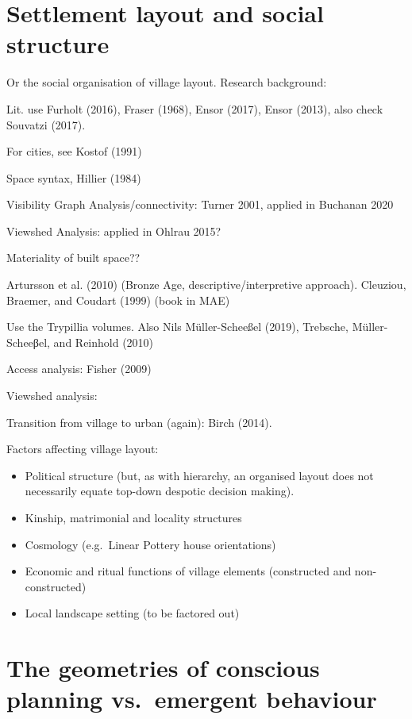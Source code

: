 \documentclass[
  12pt,
  a4paper, twoside]{book}
\begin{document}
\hypertarget{settlement-layout-and-social-structure}{%
\section{Settlement layout and social structure}\label{settlement-layout-and-social-structure}}

Or the social organisation of village layout. Research background:

Lit. use Furholt (2016), Fraser (1968), Ensor (2017), Ensor (2013), also check Souvatzi (2017).

For cities, see Kostof (1991)

Space syntax, Hillier (1984)

Visibility Graph Analysis/connectivity: Turner 2001, applied in Buchanan 2020

Viewshed Analysis: applied in Ohlrau 2015?

Materiality of built space??

Artursson et al. (2010) (Bronze Age, descriptive/interpretive approach). Cleuziou, Braemer, and Coudart (1999) (book in MAE)

Use the Trypillia volumes. Also Nils Müller-Scheeßel (2019), Trebsche, Müller-Scheeβel, and Reinhold (2010)

Access analysis: Fisher (2009)

Viewshed analysis:

Transition from village to urban (again): Birch (2014).

Factors affecting village layout:

\begin{itemize}
\item
  Political structure (but, as with hierarchy, an organised layout does not necessarily equate top-down despotic decision making).
\item
  Kinship, matrimonial and locality structures
\item
  Cosmology (e.g.~Linear Pottery house orientations)
\item
  Economic and ritual functions of village elements (constructed and non-constructed)
\item
  Local landscape setting (to be factored out)
\end{itemize}

\hypertarget{the-geometries-of-conscious-planning-vs.-emergent-behaviour}{%
\section{The geometries of conscious planning vs.~emergent behaviour}\label{the-geometries-of-conscious-planning-vs.-emergent-behaviour}}
\end{document}
